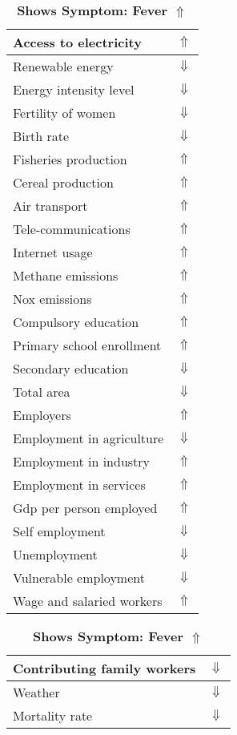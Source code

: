 \documentclass[12pt,notitlepage,oneside]{report}
\begin{document}
\begin{table}[!htb]
\caption{\textbf{Shows Symptom: Fever $\Uparrow$}}
\centering
\label{Correlated Socio-economic Factors0}
\begin{tabular}{|l|l|}
\hline
Access to electricity & $\Uparrow$\\ \hline
Renewable energy & $\Downarrow$\\ \hline
Energy intensity level & $\Downarrow$\\ \hline
Fertility of women & $\Downarrow$\\ \hline
Birth rate & $\Downarrow$\\ \hline
Fisheries production & $\Uparrow$\\ \hline
Cereal production & $\Uparrow$\\ \hline
Air transport  & $\Uparrow$\\ \hline
Tele-communications & $\Uparrow$\\ \hline
Internet usage & $\Uparrow$\\ \hline
Methane emissions & $\Uparrow$\\ \hline
Nox emissions & $\Uparrow$\\ \hline
Compulsory education & $\Uparrow$\\ \hline
Primary school enrollment & $\Uparrow$\\ \hline
Secondary education & $\Downarrow$\\ \hline
Total area & $\Downarrow$\\ \hline
Employers & $\Uparrow$\\ \hline
Employment in agriculture & $\Downarrow$\\ \hline
Employment in industry & $\Uparrow$\\ \hline
Employment in services & $\Uparrow$\\ \hline
Gdp per person employed & $\Uparrow$\\ \hline
Self employment & $\Downarrow$\\ \hline
Unemployment & $\Downarrow$\\ \hline
Vulnerable employment & $\Downarrow$\\ \hline
Wage and salaried workers & $\Uparrow$\\ \hline
\end{tabular}
\begin{tabular}{|l|l|}
\hline
Contributing family workers & $\Downarrow$\\ \hline
Weather & $\Downarrow$\\ \hline
Mortality rate & $\Downarrow$\\ \hline

\end{tabular}
\end{table}
\end{document}
